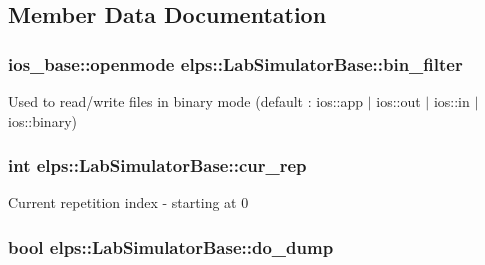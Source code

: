 \subsection{Member Data Documentation}
\hypertarget{classelps_1_1_lab_simulator_base_abf50d59bc986d5fd60cf0736da6d7cfc}{
\subsubsection[{bin\+\_\+filter}]{\setlength{\rightskip}{0pt plus 5cm}ios\+\_\+base\+::openmode elps\+::\+Lab\+Simulator\+Base\+::bin\+\_\+filter\hspace{0.3cm}{\ttfamily [protected]}}}\label{classelps_1_1_lab_simulator_base_abf50d59bc986d5fd60cf0736da6d7cfc}
Used to read/write files in binary mode (default \+: ios\+::app $\vert$ ios\+::out $\vert$ ios\+::in $\vert$ ios\+::binary) \hypertarget{classelps_1_1_lab_simulator_base_af44ecd9b5e3946131bac9e735233502b}{
\subsubsection[{cur\+\_\+rep}]{\setlength{\rightskip}{0pt plus 5cm}int elps\+::\+Lab\+Simulator\+Base\+::cur\+\_\+rep\hspace{0.3cm}{\ttfamily [protected]}}}\label{classelps_1_1_lab_simulator_base_af44ecd9b5e3946131bac9e735233502b}
Current repetition index -\/ starting at 0 \hypertarget{classelps_1_1_lab_simulator_base_ac66d131d494c485ea584bf6421a4066a}{
\subsubsection[{do\+\_\+dump}]{\setlength{\rightskip}{0pt plus 5cm}bool elps\+::\+Lab\+Simulator\+Base\+::do\+\_\+dump\hspace{0.3cm}{\ttfamily [protected]}}}\label{classelps_1_1_lab_simulator_base_ac66d131d494c485ea584bf6421a4066a}
